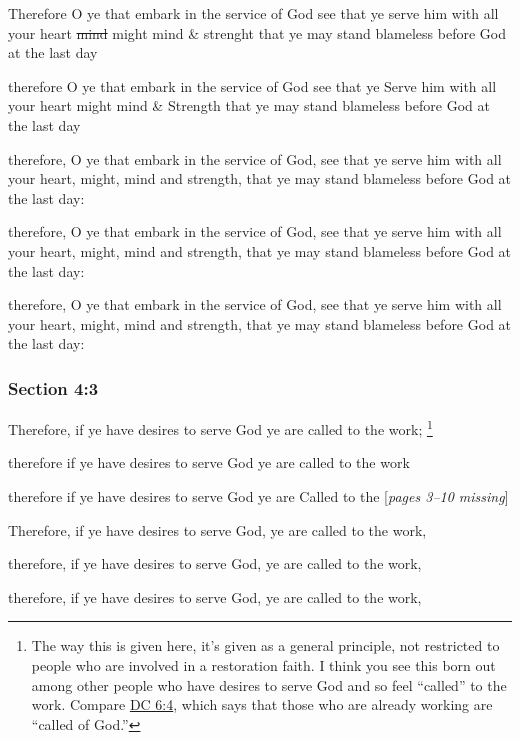 		\begin{framed}
		\scriptsize
			\begin{compactdesc}
				\item[JSP] Therefore O ye that embark in the service of God see that ye serve him with all your heart \sout{mind} might mind \& strenght that ye may stand blameless before God at the last day
				\item[RB1] therefore O ye that embark in the service of God see that ye Serve him with all your heart might mind \& Strength that ye may stand blameless before God at the last day 
				\item[BC] therefore, O ye that embark in the service of God, see that ye serve him with all your heart, might, mind and strength, that ye may stand blameless before God at the last day:
				\item[DC 1835] therefore, O ye that embark in the service of God, see that ye serve him with all your heart, might, mind and strength, that ye may stand blameless before God at the last day:
				\item[DC 1844] therefore, O ye that embark in the service of God, see that ye serve him with all your heart, might, mind and strength, that ye may stand blameless before God at the last day:
			\end{compactdesc}
		\end{framed}

	\subsubsection{Section 4:3} %
		\label{DC4-3}

		Therefore, if ye have desires to serve God ye are called to the work;%
			\footnote{%
				The way this is given here, it's given as a general principle, not restricted to people who are involved in a restoration faith. I think you see this born out among other people who have desires to serve God and so feel ``called'' to the work. Compare \hyperref[DC6-4]{DC 6:4}, which says that those who are already working are ``called of God.'' 
				}

		\begin{framed}
		\scriptsize
			\begin{compactdesc}
				\item[JSP] therefore if ye have desires to serve God ye are called to the work
				\item[RB1] therefore if ye have desires to serve God ye are Called to the [\textit{pages 3--10 missing}]
				\item[BC] Therefore, if ye have desires to serve God, ye are called to the work, 
				\item[DC 1835] therefore, if ye have desires to serve God, ye are called to the work,
				\item[DC 1844] therefore, if ye have desires to serve God, ye are called to the work,
			\end{compactdesc}
		\end{framed}

